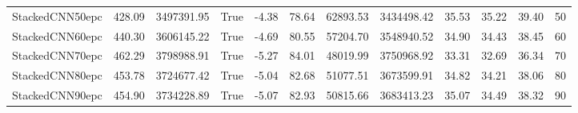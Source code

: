 \begin{tabular}{lrrlrrrrrrrl}
StackedCNN50epc & 428.09 & 3497391.95 & True & -4.38 & 78.64 & 62893.53 & 3434498.42 & 35.53 & 35.22 & 39.40 & 50 \\
StackedCNN60epc & 440.30 & 3606145.22 & True & -4.69 & 80.55 & 57204.70 & 3548940.52 & 34.90 & 34.43 & 38.45 & 60 \\
StackedCNN70epc & 462.29 & 3798988.91 & True & -5.27 & 84.01 & 48019.99 & 3750968.92 & 33.31 & 32.69 & 36.34 & 70 \\
StackedCNN80epc & 453.78 & 3724677.42 & True & -5.04 & 82.68 & 51077.51 & 3673599.91 & 34.82 & 34.21 & 38.06 & 80 \\
StackedCNN90epc & 454.90 & 3734228.89 & True & -5.07 & 82.93 & 50815.66 & 3683413.23 & 35.07 & 34.49 & 38.32 & 90 \\
\bottomrule
\end{tabular}
